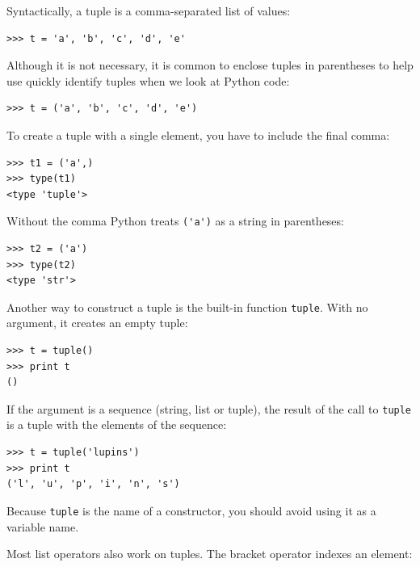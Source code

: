 \documentclass[10pt]{book}
\begin{document}

Syntactically, a tuple is a comma-separated list of values:

\beforeverb
\begin{verbatim}
>>> t = 'a', 'b', 'c', 'd', 'e'
\end{verbatim}
\afterverb
%
Although it is not necessary, it is common to enclose tuples in
parentheses to help use quickly identify tuples when we look at
Python code:


\beforeverb
\begin{verbatim}
>>> t = ('a', 'b', 'c', 'd', 'e')
\end{verbatim}
\afterverb
%
To create a tuple with a single element, you have to include the final
comma:


\beforeverb
\begin{verbatim}
>>> t1 = ('a',)
>>> type(t1)
<type 'tuple'>
\end{verbatim}
\afterverb
%
Without the comma Python treats \verb"('a')" as a string in
parentheses:

\beforeverb
\begin{verbatim}
>>> t2 = ('a')
>>> type(t2)
<type 'str'>
\end{verbatim}
\afterverb
%
Another way to construct a tuple is the built-in function {\tt tuple}.
With no argument, it creates an empty tuple:


\beforeverb
\begin{verbatim}
>>> t = tuple()
>>> print t
()
\end{verbatim}
\afterverb
%
If the argument is a sequence (string, list or tuple), the result
of the call to {\tt tuple}
is a tuple with the elements of the sequence:

\beforeverb
\begin{verbatim}
>>> t = tuple('lupins')
>>> print t
('l', 'u', 'p', 'i', 'n', 's')
\end{verbatim}
\afterverb
%
Because {\tt tuple} is the name of a constructor, you should
avoid using it as a variable name.

Most list operators also work on tuples.  The bracket operator
indexes an element:

\end{document}

